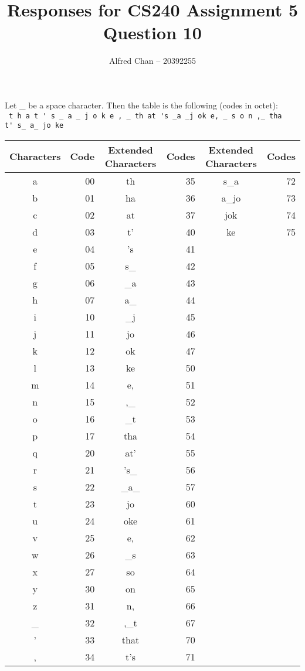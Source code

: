 \documentclass[12pt]{article}
\title{Responses for CS240 Assignment 5 Question 10}
\author{Alfred Chan -- 20392255}
\begin{document}
\maketitle
Let \_ be a space character. Then the table is the following (codes in octet):\\
\verb+ t h a t ' s _ a _ j o k e , _ th at 's _a _j ok e, _ s o n ,_ tha+\\
\verb+t' s_ a_ jo ke+ \\
\begin{tabular}{|c|r|c|r|c|r|}
\hline
Characters & Code & Extended Characters & Codes & Extended Characters & Codes\\\hline
a & 00 & th & 35 & s\_a & 72\\\hline
b & 01 & ha & 36 & a\_jo & 73\\\hline
c & 02 & at & 37 & jok & 74\\\hline
d & 03 & t' & 40 & ke & 75\\\hline
e & 04 & 's & 41\\\hline
f & 05 & s\_ & 42\\\hline
g & 06 & \_a & 43\\\hline
h & 07 & a\_ & 44\\\hline
i & 10 & \_j & 45\\\hline
j & 11 & jo & 46\\\hline
k & 12 & ok & 47\\\hline
l & 13 & ke & 50\\\hline
m & 14 & e, & 51\\\hline
n & 15 & ,\_ & 52\\\hline
o & 16 & \_t & 53\\\hline
p & 17 & tha & 54\\\hline
q & 20 & at' & 55\\\hline
r & 21 & 's\_ & 56\\\hline
s & 22 & \_a\_ & 57\\\hline
t & 23 & jo & 60\\\hline
u & 24 & oke & 61\\\hline
v & 25 & e, & 62\\\hline
w & 26 & \_s & 63\\\hline
x & 27 & so & 64\\\hline
y & 30 & on & 65\\\hline
z & 31 & n, & 66\\\hline
\_ & 32 & ,\_t & 67\\\hline
' & 33 & that & 70\\\hline
, & 34 & t's & 71\\\hline
\end{tabular}\\
\end{document}

